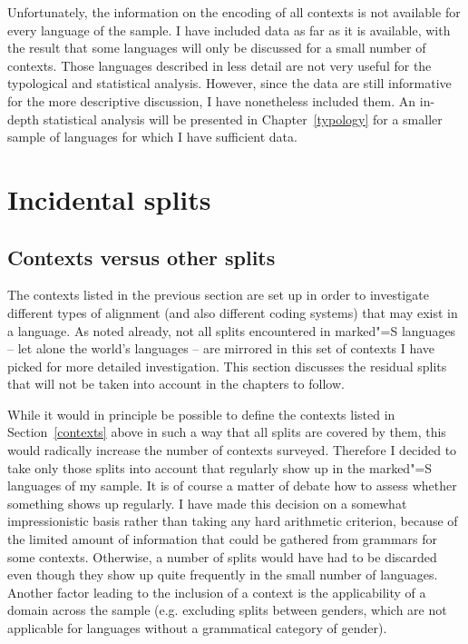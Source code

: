 Unfortunately, the information on the encoding of all contexts is not available for every language of the sample. 
I have included data as far as it is available, with the result that some languages will only be discussed for a small number of contexts. 
Those languages described in less detail are not very useful for the typological and statistical analysis. 
However, since the data are still informative for the more descriptive discussion, I have nonetheless included them. 
An in-depth statistical analysis will be presented in Chapter~\ref{typology} for a smaller sample of languages for which I have sufficient data.



\section{Incidental splits}\label{splits}

\subsection{Contexts versus other splits}

The contexts listed in the previous section are set up in order to investigate different types of alignment (and also different coding systems) that may exist in a language. 
As noted already, not all splits encountered in marked"=S languages -- let alone the world's languages -- are mirrored in this set of contexts I have picked for more detailed investigation. 
This section discusses the residual splits that will not be taken into account in the chapters to follow.

While it would in principle be possible to define the contexts listed in Section~\ref{contexts} above in such a way that all splits are covered by them, this would radically increase the number of contexts surveyed. 
Therefore I decided to take only those splits into account that regularly show up in the marked"=S languages of my sample. 
It is of course a matter of debate how to assess whether something shows up regularly. 
I have made this decision on a somewhat impressionistic basis rather than taking any hard arithmetic criterion, because of the limited amount of information that could be gathered from grammars for some contexts. 
Otherwise, a number of splits  would have had to be discarded even though they show up quite frequently in the small number of languages.
Another factor leading to the inclusion of a context is the applicability of a domain across the sample (e.g. excluding splits between genders, which are not applicable for languages without a grammatical category of gender).

